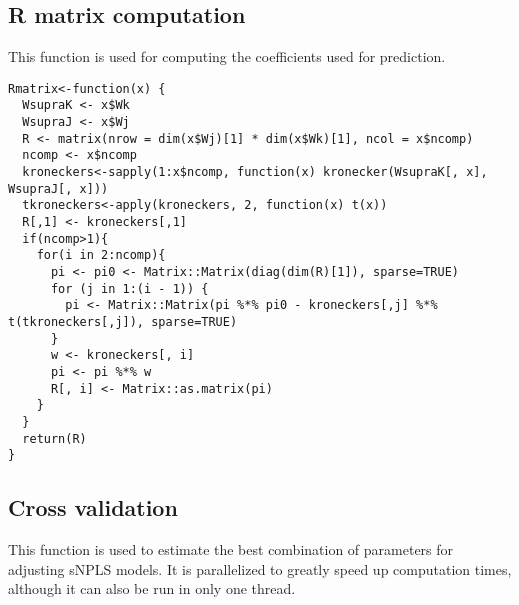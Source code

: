 \begin{scriptsize}
\begin{verbatim}
\end{verbatim}
\end{scriptsize}

\subsection{R matrix computation}
This function is used for computing the coefficients used for prediction.

\begin{scriptsize}
\begin{verbatim}
Rmatrix<-function(x) {
  WsupraK <- x$Wk
  WsupraJ <- x$Wj
  R <- matrix(nrow = dim(x$Wj)[1] * dim(x$Wk)[1], ncol = x$ncomp)
  ncomp <- x$ncomp
  kroneckers<-sapply(1:x$ncomp, function(x) kronecker(WsupraK[, x], WsupraJ[, x]))
  tkroneckers<-apply(kroneckers, 2, function(x) t(x))
  R[,1] <- kroneckers[,1]
  if(ncomp>1){
    for(i in 2:ncomp){
      pi <- pi0 <- Matrix::Matrix(diag(dim(R)[1]), sparse=TRUE)
      for (j in 1:(i - 1)) {
        pi <- Matrix::Matrix(pi %*% pi0 - kroneckers[,j] %*% t(tkroneckers[,j]), sparse=TRUE)
      }
      w <- kroneckers[, i]
      pi <- pi %*% w
      R[, i] <- Matrix::as.matrix(pi)
    }
  }
  return(R)
}

\end{verbatim}
\end{scriptsize}

\subsection{Cross validation}
This function is used to estimate the best combination of parameters for adjusting sNPLS models. It is parallelized to greatly speed up computation times, although it can also be run in only one thread.

